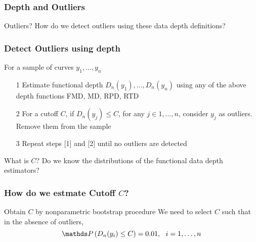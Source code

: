 \documentclass[10pt,dvipsnames,table]{beamer}
\begin{document}
%

\begin{frame}
\frametitle{Depth and Outliers}
\Large
\begin{block}{Outliers?}
How do we detect outliers using these data depth definitions?
\end{block}
\end{frame}

\begin{frame}
\frametitle{Detect Outliers using depth}
For a sample of curves $y_1, \dots , y_n$
\begin{enumerate}
\item[1] Estimate functional depth $D_n(y_1), \dots , D_n(y_n)$ using any of the above depth functions FMD, MD, RPD, RTD
\item[2] For a cutoff $C$, if $D_n(y_j) \leq C$, for any $j \in 1, \dots, n$, consider $y_j$ as outliers. Remove them from the sample
\item[3] Repeat steps [1] and [2] until no outliers are detected
\end{enumerate}
\vspace{1cm}
\begin{block}{What is $C$?}
Do we know the distributions of the functional data depth estimators?
\end{block}

\end{frame}

\begin{frame}
\frametitle{How do we estmate Cutoff $C$?}
\Large
\begin{block}{Obtain $C$ by nonparametric bootstrap procedure}
We need to select $C$ such that in the absence of outliers, \[ \Prob\left( D_n(y_i) \leq C\right) = 0.01,\ \ i = 1, \dots, n \]
\end{block}

\end{frame}
\end{document}
